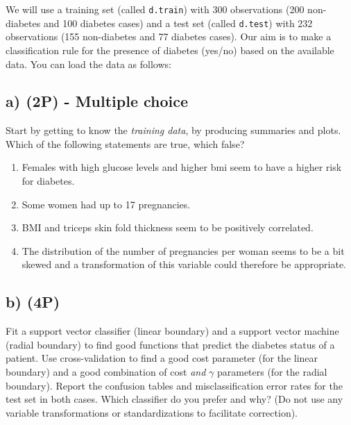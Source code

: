 \documentclass[]{article}
\newenvironment{Shaded}{\begin{snugshade}}{\end{snugshade}}
\newcommand{\CommentTok}[1]{\textcolor[rgb]{0.56,0.35,0.01}{\textit{#1}}}
\newcommand{\KeywordTok}[1]{\textcolor[rgb]{0.13,0.29,0.53}{\textbf{#1}}}
\newcommand{\NormalTok}[1]{#1}
\newcommand{\OperatorTok}[1]{\textcolor[rgb]{0.81,0.36,0.00}{\textbf{#1}}}
\newcommand{\StringTok}[1]{\textcolor[rgb]{0.31,0.60,0.02}{#1}}
\providecommand{\tightlist}{%
  \setlength{\itemsep}{0pt}\setlength{\parskip}{0pt}}
\begin{document}
We will use a training set (called \texttt{d.train}) with 300
observations (200 non-diabetes and 100 diabetes cases) and a test set
(called \texttt{d.test}) with 232 observations (155 non-diabetes and 77
diabetes cases). Our aim is to make a classification rule for the
presence of diabetes (yes/no) based on the available data. You can load
the data as follows:

\begin{Shaded}
\end{Shaded}

\hypertarget{a-2p---multiple-choice-2}{%
\subsection{a) (2P) - Multiple choice}\label{a-2p---multiple-choice-2}}

Start by getting to know the \emph{training data}, by producing
summaries and plots. Which of the following statements are true, which
false?

\begin{enumerate}
\def\labelenumi{(\roman{enumi})}
\tightlist
\item
  Females with high glucose levels and higher bmi seem to have a higher
  risk for diabetes.
\item
  Some women had up to 17 pregnancies.
\item
  BMI and triceps skin fold thickness seem to be positively correlated.
\item
  The distribution of the number of pregnancies per woman seems to be a
  bit skewed and a transformation of this variable could therefore be
  appropriate.
\end{enumerate}

\hypertarget{b-4p-1}{%
\subsection{b) (4P)}\label{b-4p-1}}

Fit a support vector classifier (linear boundary) and a support vector
machine (radial boundary) to find good functions that predict the
diabetes status of a patient. Use cross-validation to find a good cost
parameter (for the linear boundary) and a good combination of cost
\emph{and} \(\gamma\) parameters (for the radial boundary). Report the
confusion tables and misclassification error rates for the test set in
both cases. Which classifier do you prefer and why? (Do not use any
variable transformations or standardizations to facilitate correction).
\end{document}
